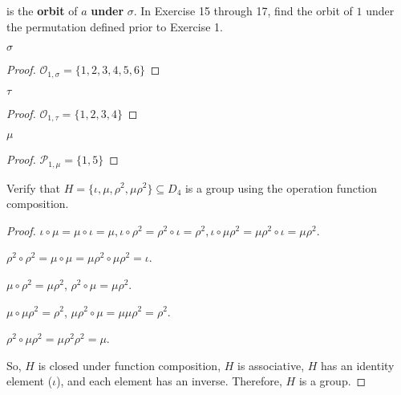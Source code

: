 is the \textbf{orbit} of $a$ \textbf{under} $\sigma$. In Exercise 15 through 17, find the orbit of $1$ under the permutation defined prior to Exercise 1.

\begin{exercise}
    $\sigma$
\end{exercise}

\begin{proof}
    $\mathcal{O}_{1,\sigma} = \{ 1, 2, 3, 4, 5, 6 \}$
\end{proof}

\begin{exercise}
    $\tau$
\end{exercise}

\begin{proof}
    $\mathcal{O}_{1,\tau} = \{ 1, 2, 3, 4 \}$
\end{proof}

\begin{exercise}
    $\mu$
\end{exercise}

\begin{proof}
    $\mathcal{P}_{1,\mu} = \{ 1, 5 \}$
\end{proof}

\begin{exercise}
    Verify that $H = \{ \iota, \mu, \rho^{2}, \mu\rho^{2} \}\subseteq D_{4}$ is a group using the operation function composition.
\end{exercise}

\begin{proof}
    $\iota\circ\mu = \mu\circ\iota = \mu, \iota\circ\rho^{2} = \rho^{2}\circ\iota = \rho^{2}, \iota\circ\mu\rho^{2} = \mu\rho^{2}\circ\iota = \mu\rho^{2}$.

    $\rho^{2}\circ\rho^{2} = \mu\circ\mu = \mu\rho^{2}\circ\mu\rho^{2} = \iota$.

    $\mu\circ\rho^{2} = \mu\rho^{2}$, $\rho^{2}\circ\mu = \mu\rho^{2}$.

    $\mu\circ\mu\rho^{2} = \rho^{2}$, $\mu\rho^{2}\circ\mu = \mu\mu\rho^{2} = \rho^{2}$.

    $\rho^{2}\circ\mu\rho^{2} = \mu\rho^{2}\rho^{2} = \mu$.

    So, $H$ is closed under function composition, $H$ is associative, $H$ has an identity element ($\iota$), and each element has an inverse. Therefore, $H$ is a group.
\end{proof}

